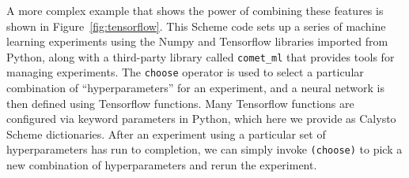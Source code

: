 \documentclass[acmsmall,screen,anonymous,review]{acmart}
\begin{document}
\noindent
A more complex example that shows the power of combining these features is
shown in Figure~\ref{fig:tensorflow}. This Scheme code sets up a series of
machine learning experiments using the Numpy and Tensorflow libraries imported
from Python, along with a third-party library called \texttt{comet\_ml} that
provides tools for managing experiments.  The \texttt{choose} operator is used
to select a particular combination of ``hyperparameters'' for an experiment,
and a neural network is then defined using Tensorflow functions.  Many
Tensorflow functions are configured via keyword parameters in Python, which
here we provide as Calysto Scheme dictionaries.  After an experiment using a
particular set of hyperparameters has run to completion, we can simply invoke
\texttt{(choose)} to pick a new combination of hyperparameters and rerun the
experiment.

\end{document}
